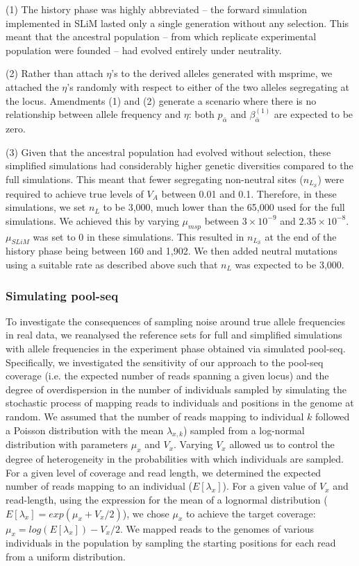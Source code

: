 \documentclass[12pt]{article}
\begin{document}
\begin{bibunit}
(1) The history phase was highly abbreviated -- the forward simulation implemented in SLiM lasted only a single generation without any selection. This meant that the ancestral population -- from which replicate experimental population were founded -- had evolved entirely under neutrality. 

(2) Rather than attach $\eta$'s to the derived alleles generated with msprime, we attached the $\eta$'s randomly with respect to either of the two alleles segregating at the locus. Amendments (1) and (2) generate a scenario where there is no relationship between allele frequency and $\eta$:  both $p_{\bar \alpha}$ and $\beta^{(1)}_{\bar \alpha}$ are expected to be zero.  

(3) Given that the ancestral population had evolved without selection, these simplified simulations had considerably higher genetic diversities compared to the full simulations. This meant that fewer segregating non-neutral sites ($n_{L_\mathcal{S}}$) were required to achieve true levels of $V_A$ between 0.01 and 0.1. Therefore, in these simulations, we set $n_L$ to be 3,000, much lower than the 65,000 used for the full simulations. We achieved this by varying $\mu_{msp}$ between $3 \times 10^{-9}$ and $2.35 \times 10^{-8}$. $\mu_{SLiM}$ was set to 0 in these simulations. This resulted in $n_{L_\mathcal{S}}$ at the end of the history phase being between 160 and 1,902. We then added neutral mutations using a suitable rate as described above such that $n_L$ was expected to be 3,000. 

\subsubsection*{Simulating pool-seq}

To investigate the consequences of sampling noise around true allele frequencies in real data, we reanalysed the reference sets for full and simplified simulations with allele frequencies in the experiment phase obtained via simulated pool-seq. Specifically, we investigated the sensitivity of our approach to the pool-seq coverage (i.e. the expected number of reads spanning a given locus) and the degree of overdispersion in the number of individuals sampled by simulating the stochastic process of mapping reads to individuals and positions in the genome at random. We assumed that the number of reads mapping to individual $k$ followed a Poisson distribution with the mean $\lambda_{x, k}$) sampled from a log-normal distribution with parameters $\mu_x$ and $V_x$. Varying $V_x$ allowed us to control the degree of heterogeneity in the probabilities with which individuals are sampled. For a given level of coverage and read length, we determined the expected number of reads mapping to an individual ($E[\lambda_{x}]$). For a given value of $V_x$ and read-length, using the expression for the mean of a lognormal distribution ($E[\lambda_{x}] = exp(\mu_x + V_x/2)$),  we chose $\mu_x$ to achieve the target coverage: $\mu_x = log(E[\lambda_{x}]) - V_x/2$. We mapped reads to the genomes of various individuals in the population by sampling the starting positions for each read from a uniform distribution.


\end{bibunit}
\end{document}
